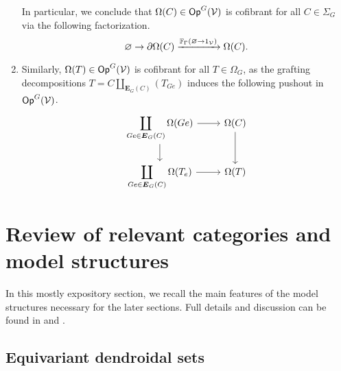 \documentclass[a4paper,10pt
,draft
]{article}%
\renewcommand{\1}{\eta}%
\begin{document}
\begin{example}
\begin{enumerate}[label = (\roman*)]
            In particular, we conclude that $\Omega(C) \in \mathsf{Op}^G(\mathcal V)$ is cofibrant for all $C \in \Sigma_G$ via the following factorization.
            \[
                  \varnothing \to \partial\Omega(C) \xrightarrow{\mathbb F_{\Gamma}(\varnothing \to 1_{\mathcal V})} \Omega(C).
            \]
      \item Similarly, $\Omega(T) \in \mathsf{Op}^G(\mathcal V)$ is cofibrant for all $T \in \Omega_G$, as
            the grafting decompositions $T = C \coprod_{\boldsymbol{E}_G(C)} (T_{Ge})$ induces the following pushout in $\mathsf{Op}^G(\mathcal V)$.
            \[
                  \begin{tikzcd}
                        \displaystyle{
                          \coprod_{Ge \in \boldsymbol{E}_G(C)} \Omega(Ge)}
                        \arrow[r] \arrow[d]
                        &
                        \Omega(C) \arrow[d]
                        \\
                        \displaystyle{
                          \coprod_{Ge \in \boldsymbol{E}_G(C)} \Omega(T_e)}
                        \arrow[r]
                        &
                        \Omega(T)
                  \end{tikzcd}
            \]            
      \end{enumerate}
\end{example}
















\newpage

\section{Review of relevant categories and model structures}

In this mostly expository section, we recall the main features of the model structures necessary for the later sections.
Full details and discussion can be found in \cite{BP_edss} and \cite{Per18}.


\subsection{Equivariant dendroidal sets}
\label{EDS_SEC}
\end{document}
